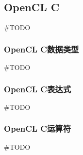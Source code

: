 \subsection{OpenCL C}
\#TODO

\subsubsection{OpenCL C数据类型}
\#TODO

\subsubsection{OpenCL C表达式}
\#TODO

\subsubsection{OpenCL C运算符}
\#TODO
